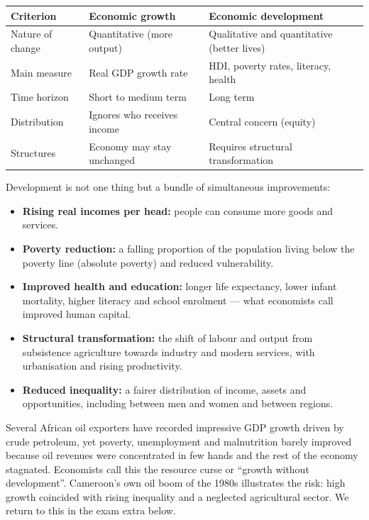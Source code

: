 \documentclass[11pt]{article}
\newcommand{\cle}[1]{{\popxbold\color{popdark}#1}}
\newcounter{popsec}
\newcounter{popsub}
\newcommand{\courssub}[1]{%
  \stepcounter{popsub}%
  \par\vspace{9pt}\noindent{\popxbold\fontsize{11.5}{13}\selectfont\color{popink}{\color{poporange}\thepopsec.\thepopsub}\hspace{6pt}#1}\par\nopagebreak\vspace{4pt}
}
\begin{document}
\begin{center}
\begin{tabularx}{\linewidth}{|l|X|X|}
\hline
\rowcolor{popblueL} \textbf{Criterion} & \textbf{Economic growth} & \textbf{Economic development} \\
\hline
Nature of change & Quantitative (more output) & Qualitative and quantitative (better lives) \\
\hline
Main measure & Real GDP growth rate & HDI, poverty rates, literacy, health \\
\hline
Time horizon & Short to medium term & Long term \\
\hline
Distribution & Ignores who receives income & Central concern (equity) \\
\hline
Structures & Economy may stay unchanged & Requires structural transformation \\
\hline
\end{tabularx}
\end{center}

\courssub{The Dimensions of Development}

Development is not one thing but a bundle of simultaneous improvements:

\begin{itemize}
\item \textbf{Rising real incomes per head:} people can consume more goods and services.
\item \textbf{Poverty reduction:} a falling proportion of the population living below the poverty line (absolute poverty) and reduced vulnerability.
\item \textbf{Improved health and education:} longer life expectancy, lower infant mortality, higher literacy and school enrolment — what economists call improved \cle{human capital}.
\item \textbf{Structural transformation:} the shift of labour and output from subsistence agriculture towards industry and modern services, with urbanisation and rising productivity.
\item \textbf{Reduced inequality:} a fairer distribution of income, assets and opportunities, including between men and women and between regions.
\end{itemize}

\begin{savaistu}
Several African oil exporters have recorded impressive GDP growth driven by crude petroleum, yet poverty, unemployment and malnutrition barely improved because oil revenues were concentrated in few hands and the rest of the economy stagnated. Economists call this the \cle{resource curse} or ``growth without development''. Cameroon's own oil boom of the 1980s illustrates the risk: high growth coincided with rising inequality and a neglected agricultural sector. We return to this in the exam extra below.
\end{savaistu}
\end{document}
